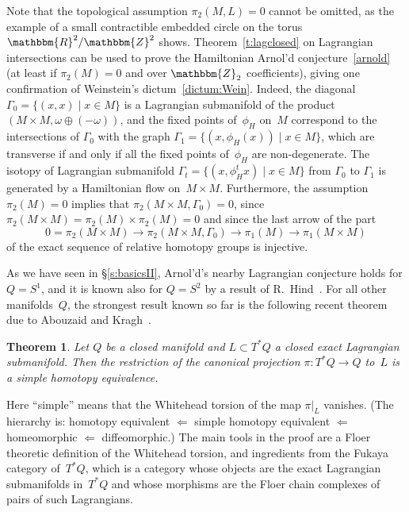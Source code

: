 \documentclass[12pt,twoside]{amsart}
\theoremstyle{plain}
\newtheorem{theorem}{Theorem}[section]
\numberwithin{figure}{section}
\numberwithin{equation}{section}
\def\m{\medskip}
\def\go{\omega}
\def\RR{\mathbbm{R}}
\def\ZZ{\mathbbm{Z}}
\def\m{\medskip}
\begin{document}
Note that the topological assumption $\pi_2 (M,L) = 0$ cannot be omitted, 
as the example of a small contractible embedded circle on the torus $\RR^2 / \ZZ^2$ shows.
Theorem~\ref{t:lagclosed} on Lagrangian intersections can be used to prove 
the Hamiltonian Arnol'd conjecture~\ref{arnold}
(at least if $\pi_2(M)=0$ and over $\ZZ_2$ coefficients), 
giving one confirmation of Weinstein's dictum~\eqref{dictum:Wein}.
Indeed, 
the diagonal $\Gamma_0 = \{ (x,x) \mid x \in M \}$ is a Lagrangian submanifold of the product
$(M \times M, \omega \oplus (-\go))$, and the fixed points of~$\phi_H$ on~$M$
correspond to the intersections of $\Gamma_0$ with the graph $\Gamma_1 = \{ (x,\phi_H(x)) \mid x \in M \}$,
which are transverse if and only if all the fixed points of~$\phi_H$ are non-degenerate.
The isotopy of Lagrangian submanifold $\Gamma_t = \{ (x,\phi_{H}^tx) \mid x \in M \}$
from $\Gamma_0$ to $\Gamma_1$ is generated by a Hamiltonian flow on~$M \times M$.
%
Furthermore, the assumption $\pi_2 (M) =0$ implies that $\pi_2(M \times M, \Gamma_0) =0$,
since $\pi_2(M \times M) = \pi_2(M) \times \pi_2(M) =0$ and since the last arrow of the part
$$
0 = \pi_2(M \times M) \to \pi_2(M \times M,\Gamma_0) \to \pi_1(M) \to \pi_1(M \times M) 
$$
of the exact sequence of relative homotopy groups is injective.

\m
As we have seen in \S \ref{s:basicsII},
Arnol'd's nearby Lagrangian conjecture
holds for $Q = S^1$, and it is known also for $Q = S^2$ by a result of R.\ Hind~\cite{Hi12}.
%
For all other manifolds~$Q$, the strongest result known so far is 
the following recent theorem due to Abouzaid and Kragh~\cite{AbKr16}.

\begin{theorem} \label{t:nearby}
Let $Q$ be a closed manifold and $L \subset T^*Q$ a closed exact Lagrangian submanifold. 
Then the restriction of the canonical projection $\pi \colon T^*Q \rightarrow Q$ to~$L$ is 
a simple homotopy equivalence.
\end{theorem}

Here ``simple'' means that the Whitehead torsion of the map $\pi|_L$ vanishes.
(The hierarchy is: homotopy equivalent $\Leftarrow$ simple homotopy equivalent $\Leftarrow$ homeomorphic 
$\Leftarrow$ diffeomorphic.)
% 
The main tools in the proof are a Floer theoretic definition of the Whitehead torsion,
and ingredients from the Fukaya category of~$T^*Q$,
which is a category whose objects are the exact Lagrangian submanifolds in~$T^*Q$ 
and whose morphisms are the Floer chain complexes of pairs of such Lagrangians. 
\end{document}
